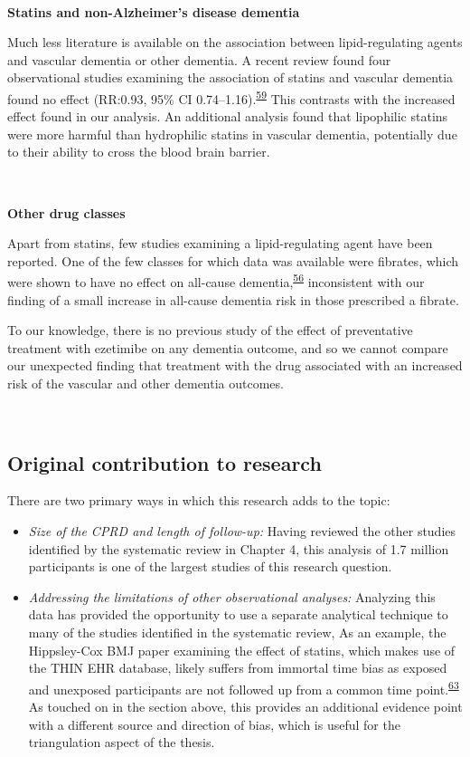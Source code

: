 \documentclass[a4paper, twoside]{templates/ociamthesis}
\providecommand{\tightlist}{%
  \setlength{\itemsep}{0pt}\setlength{\parskip}{0pt}}
\begin{document}
~

\textbf{Statins and non-Alzheimer's disease dementia}

Much less literature is available on the association between lipid-regulating agents and vascular dementia or other dementia. A recent review found four observational studies examining the association of statins and vascular dementia found no effect (RR:0.93, 95\% CI 0.74--1.16).\textsuperscript{\protect\hyperlink{ref-poly2020}{59}} This contrasts with the increased effect found in our analysis. An additional analysis found that lipophilic statins were more harmful than hydrophilic statins in vascular dementia, potentially due to their ability to cross the blood brain barrier.

~

\textbf{Other drug classes}

Apart from statins, few studies examining a lipid-regulating agent have been reported. One of the few classes for which data was available were fibrates, which were shown to have no effect on all-cause dementia,\textsuperscript{\protect\hyperlink{ref-ancelin2012}{56}} inconsistent with our finding of a small increase in all-cause dementia risk in those prescribed a fibrate.

To our knowledge, there is no previous study of the effect of preventative treatment with ezetimibe on any dementia outcome, and so we cannot compare our unexpected finding that treatment with the drug associated with an increased risk of the vascular and other dementia outcomes.

~

\hypertarget{original-contribution-to-research-1}{%
\subsection{Original contribution to research}\label{original-contribution-to-research-1}}

There are two primary ways in which this research adds to the topic:

\begin{itemize}
\tightlist
\item
  \emph{Size of the CPRD and length of follow-up:} Having reviewed the other studies identified by the systematic review in Chapter 4, this analysis of 1.7 million participants is one of the largest studies of this research question.
\item
  \emph{Addressing the limitations of other observational analyses:} Analyzing this data has provided the opportunity to use a separate analytical technique to many of the studies identified in the systematic review, As an example, the Hippsley-Cox BMJ paper examining the effect of statins, which makes use of the THIN EHR database, likely suffers from immortal time bias as exposed and unexposed participants are not followed up from a common time point.\textsuperscript{\protect\hyperlink{ref-hippisley-cox2010}{63}} As touched on in the section above, this provides an additional evidence point with a different source and direction of bias, which is useful for the triangulation aspect of the thesis.
\end{itemize}
\end{document}
